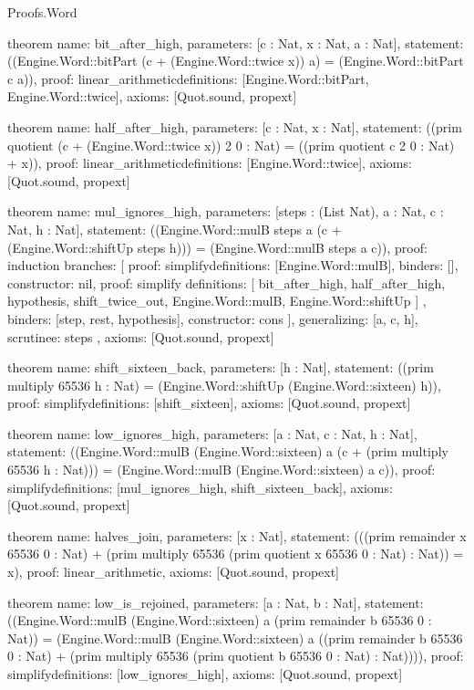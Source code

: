 \begin{lexlean}{Proofs.Word}
\begin{semanticmodule}
theorem{
  name: bit_after_high,
  parameters: [c : Nat, x : Nat, a : Nat],
  statement: ((Engine.Word::bitPart (c + (Engine.Word::twice x)) a) = (Engine.Word::bitPart c a)),
  proof: linear_arithmetic{definitions: [Engine.Word::bitPart, Engine.Word::twice]},
  axioms: [Quot.sound, propext]
}

theorem{
  name: half_after_high,
  parameters: [c : Nat, x : Nat],
  statement: ((prim quotient (c + (Engine.Word::twice x)) 2 0 : Nat) = ((prim quotient c 2 0 : Nat) + x)),
  proof: linear_arithmetic{definitions: [Engine.Word::twice]},
  axioms: [Quot.sound, propext]
}

theorem{
  name: mul_ignores_high,
  parameters: [steps : (List Nat), a : Nat, c : Nat, h : Nat],
  statement: ((Engine.Word::mulB steps a (c + (Engine.Word::shiftUp steps h))) = (Engine.Word::mulB steps a c)),
  proof: induction{
    branches: [
      {proof: simplify{definitions: [Engine.Word::mulB]}, binders: [], constructor: nil},
      {
        proof: simplify{
          definitions: [
            bit_after_high,
            half_after_high,
            hypothesis,
            shift_twice_out,
            Engine.Word::mulB,
            Engine.Word::shiftUp
          ]
        },
        binders: [step, rest, hypothesis],
        constructor: cons
      }
    ],
    generalizing: [a, c, h],
    scrutinee: steps
  },
  axioms: [Quot.sound, propext]
}

theorem{
  name: shift_sixteen_back,
  parameters: [h : Nat],
  statement: ((prim multiply 65536 h : Nat) = (Engine.Word::shiftUp (Engine.Word::sixteen) h)),
  proof: simplify{definitions: [shift_sixteen]},
  axioms: [Quot.sound, propext]
}

theorem{
  name: low_ignores_high,
  parameters: [a : Nat, c : Nat, h : Nat],
  statement: ((Engine.Word::mulB (Engine.Word::sixteen) a (c + (prim multiply 65536 h : Nat))) = (Engine.Word::mulB (Engine.Word::sixteen) a c)),
  proof: simplify{definitions: [mul_ignores_high, shift_sixteen_back]},
  axioms: [Quot.sound, propext]
}

theorem{
  name: halves_join,
  parameters: [x : Nat],
  statement: (((prim remainder x 65536 0 : Nat) + (prim multiply 65536 (prim quotient x 65536 0 : Nat) : Nat)) = x),
  proof: linear_arithmetic{},
  axioms: [Quot.sound, propext]
}

theorem{
  name: low_is_rejoined,
  parameters: [a : Nat, b : Nat],
  statement: ((Engine.Word::mulB (Engine.Word::sixteen) a (prim remainder b 65536 0 : Nat)) = (Engine.Word::mulB (Engine.Word::sixteen) a ((prim remainder b 65536 0 : Nat) + (prim multiply 65536 (prim quotient b 65536 0 : Nat) : Nat)))),
  proof: simplify{definitions: [low_ignores_high]},
  axioms: [Quot.sound, propext]
}


\end{semanticmodule}
\end{lexlean}
